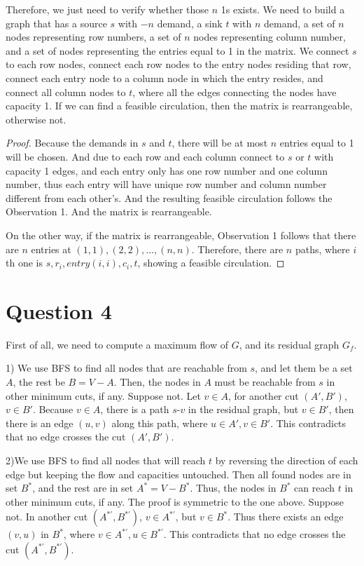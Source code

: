 \documentclass[letter,12pt]{article}
\begin{document}
 Therefore, we just need to verify whether those $n$ 1s exists. We need to
 build a graph that has a source $s$ with $-n$ demand, a sink $t$ with
 $n$ demand, a set of $n$ nodes representing row numbers, a set of $n$ 
 nodes representing column number, and a set of nodes representing the
 entries equal to 1 in the matrix. We connect $s$ to each row nodes, 
 connect each row nodes to the entry nodes residing that row, connect each  
 entry node to a column node in which the entry resides, and connect 
 all column nodes to $t$, where all the edges connecting the nodes have
 capacity 1. If we can find a feasible circulation, then the matrix is 
 rearrangeable, otherwise not.
 
 \begin{proof}
 Because the demands in $s$ and $t$, there will be at most $n$ entries equal
 to 1 will be chosen. And due to each row and each column connect to $s$
 or $t$ with capacity 1 edges, and each entry only has one row number and
 one column number, thus each entry will have unique row number and 
 column number different from each other's. And the resulting feasible 
 circulation follows the Observation 1. And the matrix is rearrangeable.
 
 On the other way, if the matrix is rearrangeable, Observation 1 follows that
 there are $n$ entries at $(1, 1), (2, 2), ..., (n, n)$. Therefore, there are $n$
 paths, where $i$th one is $s, r_i, entry(i, i), c_i, t$, showing a feasible 
 circulation.
 \end{proof}

\section*{Question 4}
First of all, we need to compute a maximum flow of $G$, and its residual
graph $G_f$. 

1) We use BFS to find all nodes that are reachable from $s$, and let them be
a set $A$, the rest be $B = V - A$. Then, the nodes in $A$ must be 
reachable from $s$ in other minimum cuts, if any. Suppose not. Let $v \in A$, 
for another cut $(A', B')$, $v \in B'$. Because $v \in A$, there is a path 
$s$-$v$ in the residual graph, but $v \in B'$, then there is an edge $(u, v)$ 
along this path, where $u \in A', v \in B'$. This contradicts that no edge 
crosses the cut $(A', B')$.

2)We use BFS to find all nodes that will reach $t$ by reversing the direction
of each edge but keeping the flow and capacities untouched. Then all found
nodes are in set $B^*$, and the rest are in set $A^* = V - B^*$. Thus, the
nodes in $B^*$ can reach $t$ in other minimum cuts, if any. The proof is 
symmetric to the one above. Suppose not. In another cut $(A^{*'}, B^{*'})$,
$v \in A^{*'}$, but $v \in B^*$. Thus there exists an edge $(v, u)$ in $B^*$, 
where $v \in A^{*'}, u \in B^{*'}$. This contradicts that no edge crosses the 
cut $(A^{*'}, B^{*'})$.
\end{document}
